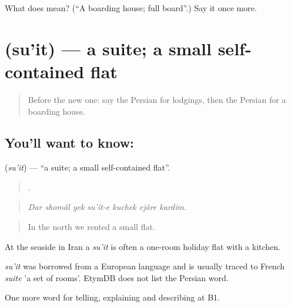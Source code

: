 \begin{tcolorbox}[breakable,colback=teal!4,colframe=teal!35!black,title={Before you move on}]
What does  mean? (\textquotedblleft{}A boarding house; full board\textquotedblright{}.) Say it once more.
\end{tcolorbox}
\section[\texorpdfstring{\fa{سوئیت} (su'it)}{سوئیت (su'it)}]{ (su'it) — a suite; a small self-contained flat}

\label{lesson:FA-C437-suit}



\begin{quote}
Before the new one: say the Persian for lodgings, then the Persian for a boarding house.
\end{quote}

\subsection*{You'll want to know: }
\textbf{} (\emph{su'it}) — \textquotedblleft{}a suite; a small self-contained flat\textquotedblright{}.

\begin{quote}
      .
\end{quote}

\begin{quote}
\emph{Dar shomâl yek su'it-e kuchek ejâre kardim.}
\end{quote}

\begin{quote}
In the north we rented a small flat.
\end{quote}

At the seaside in Iran a \emph{su'it} is often a one-room holiday flat with a kitchen.

\begin{cousinweb}
\emph{su'it} was borrowed from a European language and is usually traced to French \emph{suite} 'a set of rooms'. EtymDB does not list the Persian word.
\end{cousinweb}

\begin{grammarlens}[title={What you've built}]
One more word for telling, explaining and describing at B1.
\end{grammarlens}

